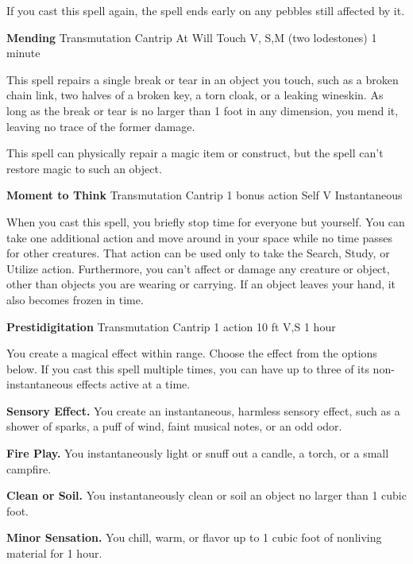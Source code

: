 If you cast this spell again, the spell ends early on any pebbles still affected by it.



\DndSpellHeader%
{\textbf{Mending}}
{Transmutation Cantrip}
{At Will}
{Touch}
{V, S,M (two lodestones)}
{1 minute}

This spell repairs a single break or tear in an object you touch, such as a broken chain link, two halves of a broken key, a torn cloak, or a leaking wineskin. As long as the break or tear is no larger than 1 foot in any dimension, you mend it, leaving no trace of the former damage.

This spell can physically repair a magic item or construct, but the spell can't restore magic to such an object.

\DndSpellHeader%
{\textbf{Moment to Think}}
{Transmutation Cantrip}
{1 bonus action}
{Self}
{V}
{Instantaneous}

When you cast this spell, you briefly stop time for everyone but yourself. You can take one additional action and move around in your space while no time passes for other creatures. That action can be used only to take the Search, Study, or Utilize action. Furthermore, you can’t affect or damage any creature or object, other than objects you are wearing or carrying. If an object leaves your hand, it also becomes frozen in time.


\DndSpellHeader%
{\textbf{Prestidigitation}}
{Transmutation Cantrip}
{1 action}
{10 ft}
{V,S}
{1 hour}

You create a magical effect within range. Choose the effect from the options below. If you cast this spell multiple times, you can have up to three of its non-instantaneous effects active at a time.

{\textbf{Sensory Effect.}} You create an instantaneous, harmless sensory effect, such as a shower of sparks, a puff of wind, faint musical notes, or an odd odor.

{\textbf{Fire Play.}} You instantaneously light or snuff out a candle, a torch, or a small campfire.

{\textbf{Clean or Soil.}} You instantaneously clean or soil an object no larger than 1 cubic foot.

{\textbf{Minor Sensation.}} You chill, warm, or flavor up to 1 cubic foot of nonliving material for 1 hour.

